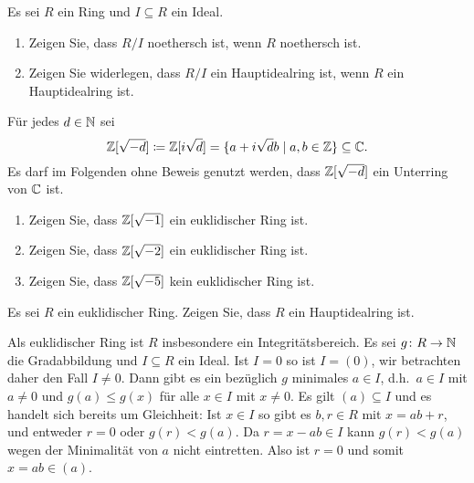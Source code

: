 

\begin{question}
  Es sei $R$ ein Ring und $I \subseteq R$ ein Ideal.
  \begin{enumerate}
    \item
      Zeigen Sie, dass $R/I$ noethersch ist, wenn $R$ noethersch ist.
    \item
      Zeigen Sie widerlegen, dass $R/I$ ein Hauptidealring ist, wenn $R$ ein Hauptidealring ist.
  \end{enumerate}
\end{question}




\begin{question}
  Für jedes $d \in \mathbb{N}$ sei
  \[
              \mathbb{Z}[\sqrt{-d}]
    \coloneqq \mathbb{Z}[i\sqrt{d}]
    =         \{a + i \sqrt{d} b \mid a, b \in \mathbb{Z} \}
    \subseteq \mathbb{C}.
  \]
  Es darf im Folgenden ohne Beweis genutzt werden, dass $\mathbb{Z}[\sqrt{-d}]$ ein Unterring von $\mathbb{C}$ ist.
  \begin{enumerate}
    \item
      Zeigen Sie, dass $\mathbb{Z}[\sqrt{-1}]$ ein euklidischer Ring ist.
    \item
      Zeigen Sie, dass $\mathbb{Z}[\sqrt{-2}]$ ein euklidischer Ring ist.
    \item
      Zeigen Sie, dass $\mathbb{Z}[\sqrt{-5}]$ kein euklidischer Ring ist.
  \end{enumerate}
\end{question}




\begin{question}
  Es sei $R$ ein euklidischer Ring.
  Zeigen Sie, dass $R$ ein Hauptidealring ist.
\end{question}


\begin{solution}
  Als euklidischer Ring ist $R$ insbesondere ein Integritätsbereich.
  Es sei $g \colon R \to \mathbb{N}$ die Gradabbildung und $I \subseteq R$ ein Ideal.
  Ist $I = 0$ so ist $I = (0)$, wir betrachten daher den Fall $I \neq 0$.
  Dann gibt es ein bezüglich $g$ minimales $a \in I$, d.h.\ $a \in I$ mit $a \neq 0$ und $g(a) \leq g(x)$ für alle $x \in I$ mit $x \neq 0$.
  Es gilt $(a) \subseteq I$ und es handelt sich bereits um Gleichheit:
  Ist $x \in I$ so gibt es $b, r \in R$ mit $x = ab + r$, und entweder $r = 0$ oder $g(r) < g(a)$.
  Da $r = x - ab \in I$ kann $g(r) < g(a)$ wegen der Minimalität von $a$ nicht eintretten.
  Also ist $r = 0$ und somit $x = ab \in (a)$.
\end{solution}


